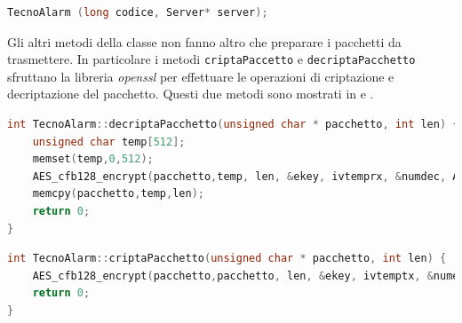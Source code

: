 \begin{lstlisting}[language=C++,caption=Costruttore della classe Tecnoalarm,label=lst:costtecno]
TecnoAlarm (long codice, Server* server);
\end{lstlisting}
Gli altri metodi della classe non fanno altro che preparare i pacchetti da trasmettere. In particolare i metodi \texttt{criptaPaccetto} e \texttt{decriptaPacchetto} sfruttano la libreria \emph{openssl}\cite{openssl} per effettuare le operazioni di criptazione e decriptazione del pacchetto. Questi due metodi sono mostrati in  e .
\begin{lstlisting}[language=C++,caption=Metodo decriptaPacchetto,label=lst:decripta]
int TecnoAlarm::decriptaPacchetto(unsigned char * pacchetto, int len) {
    unsigned char temp[512];
    memset(temp,0,512);
    AES_cfb128_encrypt(pacchetto,temp, len, &ekey, ivtemprx, &numdec, AES_DECRYPT);
    memcpy(pacchetto,temp,len);
    return 0; 
}
\end{lstlisting}
\begin{lstlisting}[language=C++,caption=Metodo criptaPacchetto,label=lst:cripta]
int TecnoAlarm::criptaPacchetto(unsigned char * pacchetto, int len) {
    AES_cfb128_encrypt(pacchetto,pacchetto, len, &ekey, ivtemptx, &numenc, AES_ENCRYPT);
    return 0;
}
\end{lstlisting}
